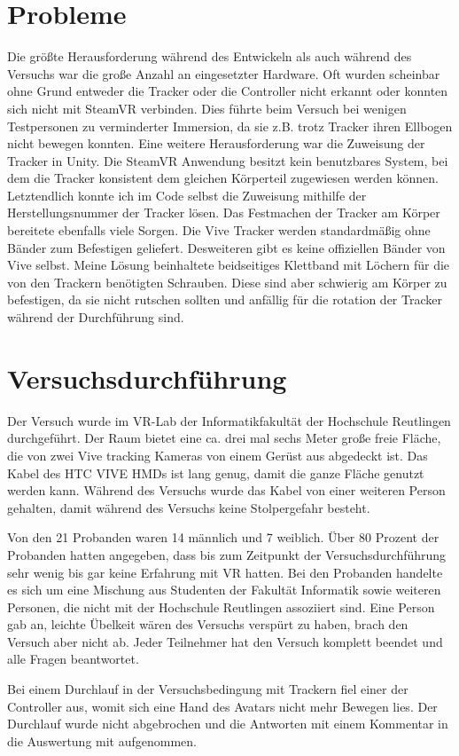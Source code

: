 \section{Probleme}
Die größte Herausforderung während des Entwickeln als auch während des Versuchs war die große Anzahl an eingesetzter Hardware. Oft wurden scheinbar ohne Grund entweder die Tracker oder die Controller nicht erkannt oder konnten sich nicht mit SteamVR verbinden. Dies führte beim Versuch bei wenigen Testpersonen zu verminderter Immersion, da sie z.B. trotz Tracker ihren Ellbogen nicht bewegen konnten. 
Eine weitere Herausforderung war die Zuweisung der Tracker in Unity. Die SteamVR Anwendung besitzt kein benutzbares System, bei dem die Tracker konsistent dem gleichen Körperteil zugewiesen werden können. Letztendlich konnte ich im Code selbst die Zuweisung mithilfe der Herstellungsnummer der Tracker lösen.
Das Festmachen der Tracker am Körper bereitete ebenfalls viele Sorgen. Die Vive Tracker werden standardmäßig ohne Bänder zum Befestigen geliefert. Desweiteren gibt es keine offiziellen Bänder von Vive selbst. Meine Lösung beinhaltete beidseitiges Klettband mit Löchern für die von den Trackern benötigten Schrauben. Diese sind aber schwierig am Körper zu befestigen, da sie nicht rutschen sollten und  anfällig für die rotation der Tracker während der Durchführung sind.
 

\section{Versuchsdurchführung}
Der Versuch wurde im VR-Lab der Informatikfakultät der Hochschule Reutlingen durchgeführt. Der Raum bietet eine ca. drei mal sechs Meter große freie Fläche, die von zwei Vive tracking Kameras von einem Gerüst aus abgedeckt ist. Das Kabel des HTC VIVE HMDs ist lang genug, damit die ganze Fläche genutzt werden kann. Während des Versuchs wurde das Kabel von einer weiteren Person gehalten, damit während des Versuchs keine Stolpergefahr besteht.

Von den 21 Probanden waren 14 männlich und 7 weiblich. Über 80 Prozent der Probanden hatten angegeben, dass bis zum Zeitpunkt der Versuchsdurchführung sehr wenig bis gar keine Erfahrung mit VR hatten. Bei den Probanden handelte es sich um eine Mischung aus Studenten der Fakultät Informatik sowie weiteren Personen, die nicht mit der Hochschule Reutlingen assoziiert sind. 
Eine Person gab an, leichte Übelkeit wären des Versuchs verspürt zu haben, brach den Versuch aber nicht ab. Jeder Teilnehmer hat den Versuch komplett beendet und alle Fragen beantwortet.

Bei einem Durchlauf in der Versuchsbedingung mit Trackern fiel einer der Controller aus, womit sich eine Hand des Avatars nicht mehr Bewegen lies. Der Durchlauf wurde nicht abgebrochen und die Antworten mit einem Kommentar in die Auswertung mit aufgenommen.




 
 
